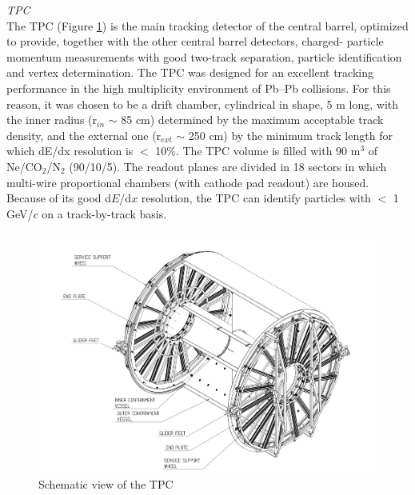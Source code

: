 {\Large\textsl{TPC}}\\
The TPC \cite{cite:TPC} (Figure \ref{fig:tpc}) is the main tracking detector of the central barrel, optimized to provide, together with the other central barrel detectors, charged- particle momentum measurements with good two-track separation, particle identification and vertex determination. The TPC was designed for an excellent tracking performance in the high multiplicity environment of Pb--Pb collisions. For this reason, it was chosen to be a drift chamber, cylindrical in shape, 5 m long, with the inner radius (r$_{in}$ $\sim$ 85 cm) determined by the maximum acceptable track density, and the external one (r$_{ext}$ $\sim$ 250 cm) by the minimum track length for which dE/dx resolution is $<$ 10\%. The TPC volume is filled with 90 m$^{3}$ of Ne/CO$_{2}$/N$_{2}$ (90/10/5). The readout planes are divided in 18 sectors in which multi-wire proportional chambers (with cathode pad readout) are housed. Because of its good d$E$/d$x$ resolution, the TPC can identify particles with \pt $<$ 1 GeV/$c$ on a track-by-track basis. 

\begin{figure}[htbp]
\begin{center}
\includegraphics[width=10.cm]{./Version1/FigChapter4/FigureTPC}
\caption{Schematic view of the TPC}
\label{fig:tpc}
\end{center}
\end{figure}

